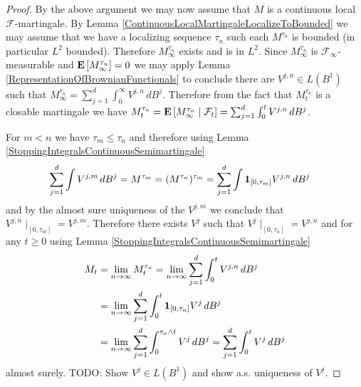 \begin{proof}
By the above argument we may now assume that $M$ is a continuous local $\mathcal{F}$-martingale.  By Lemma \ref{ContinuousLocalMartingaleLocalizeToBounded} we may assume that we have a localizing sequence $\tau_n$ such each $M^{\tau_n}$ is bounded (in particular $L^2$ bounded).  Therefore $M^{\tau_n}_\infty$ exists and is in $L^2$.  Since $M^{\tau_n}_\infty$ is $\mathcal{F}_\infty$-measurable and $\expectation{M^{\tau_n}_\infty}=0$ we may apply Lemma \ref{RepresentationOfBrownianFunctionals} to conclude there are $V^{j,n} \in L(B^1)$ such that $M^{\tau_n}_\infty = \sum_{j=1}^d \int_0^\infty V^{j,n} \, dB^j$.  Therefore from the fact that $M^{\tau_n}_t$ is a closable martingale we have $M^{\tau_n}_t = \cexpectationlong{\mathcal{F}_t}{M^{\tau_n}_\infty} = \sum_{j=1}^d \int_0^t V^{j,n} \, dB^j$.

For $m < n$ we have $\tau_m \leq \tau_n$ and therefore using Lemma \ref{StoppingIntegralsContinuousSemimartingale}
\begin{align*}
\sum_{j=1}^d \int V^{j,m} \, dB^j &= M^{\tau_m} = (M^{\tau_n})^{\tau_m} = \sum_{j=1}^d \int \characteristic{[0,\tau_m]} V^{j,n} \, dB^j
\end{align*}
and by the almost sure uniqueness of the $V^{j,m}$ we conclude that $V^{j,n}\mid_{[0,\tau_m]} = V^{j,m}$.  Therefore there exists $V^j$ such that $V^j \mid_{[0,\tau_n]} = V^{j,n}$ and for any $t \geq 0$ using Lemma \ref{StoppingIntegralsContinuousSemimartingale}
\begin{align*}
M_t &= \lim_{n \to \infty} M^{\tau_n}_t =  \lim_{n \to \infty} \sum_{j=1}^d \int_0^t V^{j,n} \, dB^j \\
&= \lim_{n \to \infty}  \sum_{j=1}^d \int_0^t \characteristic{[0,\tau_n]} V^{j} \, dB^j \\
&=  \lim_{n \to \infty} \sum_{j=1}^d \int_0^{\tau_n \wedge t} V^{j} \, dB^j = \sum_{j=1}^d \int_0^{t} V^{j} \, dB^j 
\end{align*}
almost surely.
TODO: Show $V^j \in L(B^1)$ and show a.s. uniqueness of $V^j$.
\end{proof}

